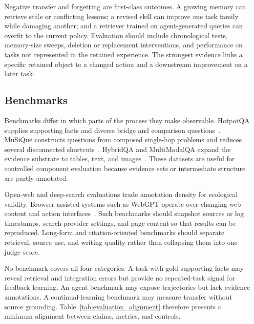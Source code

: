 Negative transfer and forgetting are first-class outcomes. A growing memory can retrieve stale or conflicting lessons; a revised skill can improve one task family while damaging another; and a retriever trained on agent-generated queries can overfit to the current policy. Evaluation should include chronological tests, memory-size sweeps, deletion or replacement interventions, and performance on tasks not represented in the retained experience. The strongest evidence links a specific retained object to a changed action and a downstream improvement on a later task.

\subsection{Benchmarks}
\label{subsec:benchmarks}

Benchmarks differ in which parts of the process they make observable. HotpotQA supplies supporting facts and diverse bridge and comparison questions~\cite{yang2018hotpotqa}. MuSiQue constructs questions from composed single-hop problems and reduces several disconnected shortcuts~\cite{trivedi2022musique}. HybridQA and MultiModalQA expand the evidence substrate to tables, text, and images~\cite{chen2020hybridqa,talmor2021multimodalqa}. These datasets are useful for controlled component evaluation because evidence sets or intermediate structure are partly annotated.

Open-web and deep-search evaluations trade annotation density for ecological validity. Browser-assisted systems such as WebGPT operate over changing web content and action interfaces~\cite{nakano2021webgpt}. Such benchmarks should snapshot sources or log timestamps, search-provider settings, and page content so that results can be reproduced. Long-form and citation-oriented benchmarks should separate retrieval, source use, and writing quality rather than collapsing them into one judge score.

No benchmark covers all four categories. A task with gold supporting facts may reveal retrieval and integration errors but provide no repeated-task signal for feedback learning. An agent benchmark may expose trajectories but lack evidence annotations. A continual-learning benchmark may measure transfer without source grounding. Table~\ref{tab:evaluation_alignment} therefore presents a minimum alignment between claims, metrics, and controls.

